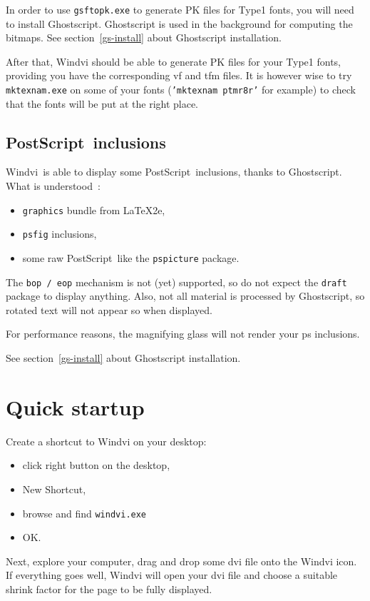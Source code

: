 \documentclass[a4paper,11pt]{article}
\def\WDVI{\textsf{Windvi}}
\begin{document}
In order to use \texttt{gsftopk.exe} to generate PK files for Type1 fonts, you
will need to install Ghostscript. Ghostscript is used in the background
for computing the bitmaps. See section~\ref{gs-install} about
Ghostscript installation.

After that, \WDVI{} should be able to generate PK files for your Type1
fonts, providing you have the corresponding vf and tfm  files. It is
however wise to try \texttt{mktexnam.exe} on some of your fonts
(\texttt{'mktexnam ptmr8r'} for example) to check that the fonts will
be put at the right place.

\subsection{PostScript\TM\ inclusions}

\WDVI\ is able to display some PostScript\TM\ inclusions, thanks to
Ghostscript. What is understood~:
\begin{itemize}
\item \texttt{graphics} bundle from \LaTeX2e,
\item \texttt{psfig} inclusions,
\item some raw PostScript\TM\ like the \texttt{pspicture} package.
\end{itemize}

The \texttt{bop / eop} mechanism  is not (yet) supported, so do  not
expect the \texttt{draft} package to  display anything. Also, not  all
material is processed by Ghostscript, so  rotated text will not appear
so when displayed.

For performance reasons, the  magnifying glass will  not render your ps
inclusions.

See section~\ref{gs-install} about Ghostscript installation.

\section{Quick startup}

Create a shortcut to \WDVI{} on your desktop:
\begin{itemize}
\item click right button on the desktop,
\item New Shortcut,
\item browse and find \texttt{windvi.exe}
\item OK.
\end{itemize}

Next, explore your computer, drag and drop some dvi file onto the
\WDVI{} icon. If everything goes well, \WDVI{}
will open your dvi file and choose a suitable shrink factor for the
page to be fully displayed.
\end{document}
